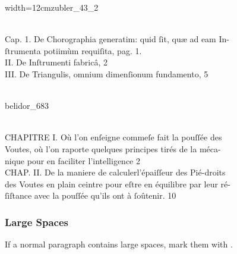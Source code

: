 \begin{sampleImageSmall}[ 1]{width=12cm}{zubler_43_2}

\begin{typeLatin}
 \\
Cap. 1.  De Chorographia generatim: quid ſit,  quæ ad eam In-\\
 ſtrumenta potiimùm requiſita,  pag. 1. \\
II.  De Inſtrumenti fabricâ,  2 \\
III.  De Triangul{is}, omnium dimenſionum fundamento,  5 \\
\someText \\
\end{typeLatin}
\end{sampleImageSmall}


\begin{sampleImage}[ 2]{belidor_683}

\begin{typeLatin}
 \\
CHAPITRE I. Où l'on enſeigne comme\lwr ſe fait la pouſſée des \\
 Voutes,  où l'on raporte quelques principes tirés de la méca- \\
 nique pour en faciliter l'intelligence  2 \\
CHAP. II.  De la maniere de calculer\lwr l'épaiſſeur des Pié-droits \\
 des Voutes en plain ceintre pour eſtre en équilibre par leur ré- \\
 ſiſtance avec la pouſſée qu'ils ont à ſoûtenir.  10  \\
\end{typeLatin}
\end{sampleImage}


\subsubsection{Large Spaces}
\begin{mainrule}
If a normal paragraph contains large spaces, mark them with .
\end{mainrule}

